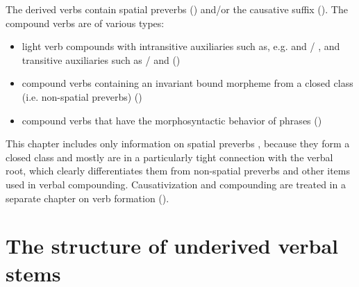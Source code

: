 The derived verbs contain spatial preverbs () and\slash or the causative suffix (). The compound verbs are of various types:
%
\begin{itemize}
	\item	light verb compounds with intransitive auxiliaries such as, e.g.   and \slash{} , and transitive auxiliaries such as \slash{}  and   ()
	\item	compound verbs containing an invariant bound morpheme from a closed class (i.e. non-spatial preverbs) ()
	\item	compound verbs that have the morphosyntactic behavior of phrases ()
\end{itemize}

This chapter includes only information on spatial preverbs , because they form a closed class and mostly are in a particularly tight connection with the verbal root, which clearly differentiates them from non-spatial preverbs and other items used in verbal compounding. Causativization and compounding are treated in a separate chapter on verb formation ().


\section{The structure of underived verbal stems}
\label{sec:The structure underived verbal stems}

